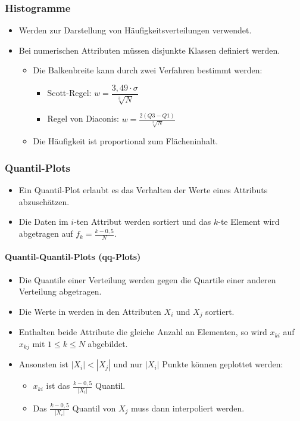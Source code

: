 \documentclass{scrartcl}
\begin{document}
\subsubsection{Histogramme}

\begin{itemize}
	\item Werden zur Darstellung von Häufigkeitsverteilungen verwendet.
	\item Bei numerischen Attributen müssen disjunkte Klassen definiert werden.
	\begin{itemize}
		\item Die Balkenbreite kann durch zwei Verfahren bestimmt werden:
		\begin{itemize}
			\item Scott-Regel: $ w = \dfrac{3,49 \cdot \sigma}{\sqrt[3]{N}} $
			\item Regel von Diaconis: $ w = \frac{2(Q3-Q1)}{\sqrt[3]{N}} $
		\end{itemize}
		\item Die Häufigkeit ist proportional zum Flächeninhalt.
	\end{itemize}
\end{itemize}

\subsubsection{Quantil-Plots}

\begin{itemize}
	\item Ein Quantil-Plot erlaubt es das Verhalten der Werte eines Attributs 
	abzuschätzen.
	\item Die Daten im $ i $-ten Attribut werden sortiert und das $ k $-te 
	Element wird abgetragen auf $ f_k = \frac{k-0,5}{N} $.
\end{itemize}

\paragraph{Quantil-Quantil-Plots (qq-Plots)}

\begin{itemize}
	\item Die Quantile einer Verteilung werden gegen die Quartile einer anderen 
	Verteilung abgetragen.
	\item Die Werte in werden in den Attributen $ X_i $ und $ X_j $ sortiert.
	\item Enthalten beide Attribute die gleiche Anzahl an Elementen, so wird $ 
	x_{ki} $ auf $ x_{kj} $ mit $ 1 \leq k \leq N $ abgebildet.
	\item Ansonsten ist $ |X_i| < |X_j| $ und nur $ |X_i| $ Punkte können 
	geplottet werden:
	\begin{itemize}
		\item $ x_{ki} $ ist das $ \frac{k-0,5}{|X_i|} $ Quantil.
		\item Das $ \frac{k-0,5}{|X_i|} $ Quantil von $ X_j $ muss dann 
		interpoliert werden.
	\end{itemize}
\end{itemize}
\end{document}
